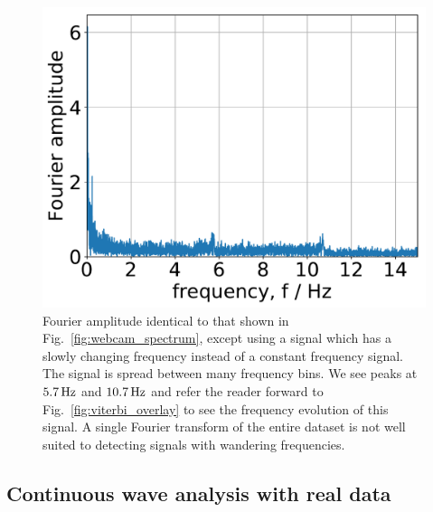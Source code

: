 \documentclass[paper-main.tex]{subfiles}
\begin{document}
\begin{figure}
	\includegraphics[width=.5\textwidth]{figures/viterbi_comparison_entire_spectrum_viterbi_test_webcam.pdf}
	\caption{\label{fig:viterbi_comparison_webcam_spectrum}
Fourier amplitude identical to that shown in Fig.~\ref{fig:webcam_spectrum}, except using a signal which has a slowly changing frequency instead of a constant frequency signal.
The signal is spread between many frequency bins. 
We see peaks at $5.7\,{\rm Hz}$ and $10.7\,{\rm Hz}$ and refer the reader forward to Fig.~\ref{fig:viterbi_overlay} to see the frequency evolution of this signal. 
A single Fourier transform of the entire dataset is not well suited to detecting signals with wandering frequencies.
}
\end{figure}


\subsection{Continuous wave analysis with real data}
\label{sec:realCWSearches}
\end{document}
